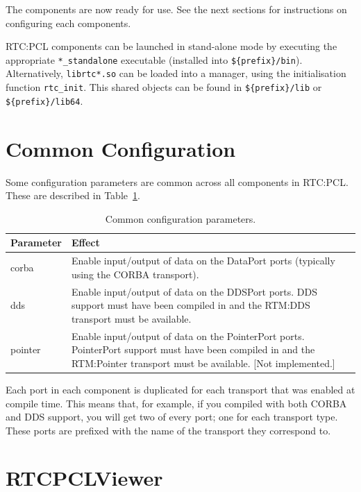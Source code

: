 \documentclass[a4paper,10pt]{article}
\begin{document}
The components are now ready for use. See the next sections for instructions on
configuring each components.

RTC:PCL components can be launched in stand-alone mode by executing the
appropriate \verb|*_standalone| executable (installed into
\verb|${prefix}/bin|). Alternatively, \verb|librtc*.so| can be loaded into a
manager, using the initialisation function \verb|rtc_init|. This shared objects
can be found in \verb|${prefix}/lib| or \verb|${prefix}/lib64|.


\section{Common Configuration}
\label{sec:common_configuration}

Some configuration parameters are common across all components in RTC:PCL.
These are described in Table~\ref{tab:common_config_params}.

\begin{table}[t]
  \centering
  \begin{tabularx}{\columnwidth}{lX}
    \toprule
    Parameter & Effect \\
    \midrule
    corba & Enable input/output of data on the DataPort ports (typically using the CORBA transport). \\
    dds & Enable input/output of data on the DDSPort ports. DDS support must have been compiled in and the RTM:DDS transport must be available. \\
    pointer & Enable input/output of data on the PointerPort ports. PointerPort support must have been compiled in and the RTM:Pointer transport must be available. [Not implemented.] \\
    \bottomrule
  \end{tabularx}
  \caption{Common configuration parameters.}
  \label{tab:common_config_params}
\end{table}

Each port in each component is duplicated for each transport that was enabled
at compile time. This means that, for example, if you compiled with both CORBA
and DDS support, you will get two of every port; one for each transport type.
These ports are prefixed with the name of the transport they correspond to.

\section{RTCPCLViewer}
\label{sec:rtcpclviewer}
\end{document}
